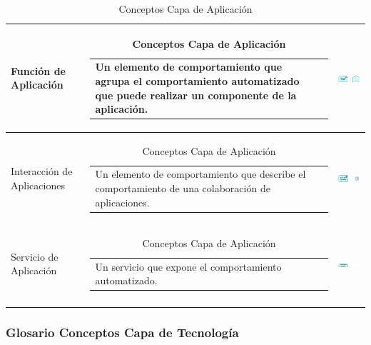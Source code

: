 \begin{longtable}[c]{|p{2.5cm}|l|c|}
	Función de Aplicación		& \begin{tabular}[c]{p{7cm}@{}l@{}}Un elemento de comportamiento que agrupa el comportamiento automatizado que puede realizar un componente de la aplicación.\end{tabular} & \includegraphics[width=35mm]{arquitectura/adm_lenguaje/imgs/application/ApplicationFunction}          \\ \hline
	Interacción de Aplicaciones	& \begin{tabular}[c]{p{7cm}@{}l@{}}Un elemento de comportamiento que describe el comportamiento de una colaboración de aplicaciones.\end{tabular} & \includegraphics[width=35mm]{arquitectura/adm_lenguaje/imgs/application/ApplicationInteraction}          \\ \hline
	Servicio de Aplicación	   	& \begin{tabular}[c]{p{7cm}@{}l@{}}Un servicio que expone el comportamiento automatizado.\end{tabular} & \includegraphics[width=35mm]{arquitectura/adm_lenguaje/imgs/application/ApplicationService}          \\ \hline
	\caption{Conceptos Capa de Aplicación \cite{WEB7}}
\end{longtable}

\newpage

\subsubsection{Glosario Conceptos Capa de Tecnología}


